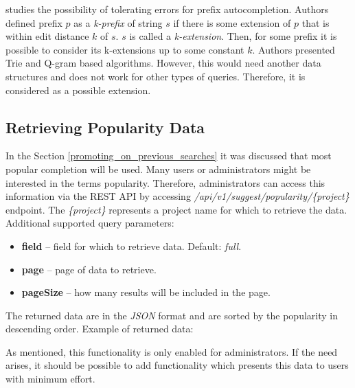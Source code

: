 \citep{Chaudhuri09extendingautocompletion} studies the possibility of tolerating errors for prefix autocompletion.
Authors defined prefix $p$ as a \textit{k-prefix} of string $s$ if there is some extension of $p$ that is within edit
distance $k$ of $s$. $s$ is called a \textit{k-extension}. Then, for some prefix it is possible to consider its
k-extensions up to some constant $k$. Authors presented Trie and Q-gram based algorithms. However, this would need
another data structures and does not work for other types of queries. Therefore, it is considered as a possible extension.

\subsection{Retrieving Popularity Data}
\label{retrieving_popularity_data}

In the Section \ref{promoting_on_previous_searches} it was discussed that most popular completion will be used. Many users or
administrators might be interested in the terms popularity. Therefore, administrators can access this information
via the REST API by accessing \textit{/api/v1/suggest/popularity/\{project\}} endpoint. The \textit{\{project\}} represents
a project name for which to retrieve the data. Additional supported query parameters:
\begin{itemize}
    \item \textbf{field} – field for which to retrieve data. Default: \textit{full}.
    \item \textbf{page} – page of data to retrieve.
    \item \textbf{pageSize} – how many results will be included in the page.
\end{itemize}

The returned data are in the \textit{JSON} format and are sorted by the popularity in descending order. Example of returned data:
\begin{code}
\end{code}

As mentioned, this functionality is only enabled for administrators. If the need arises, it should be possible to add
functionality which presents this data to users with minimum effort.
